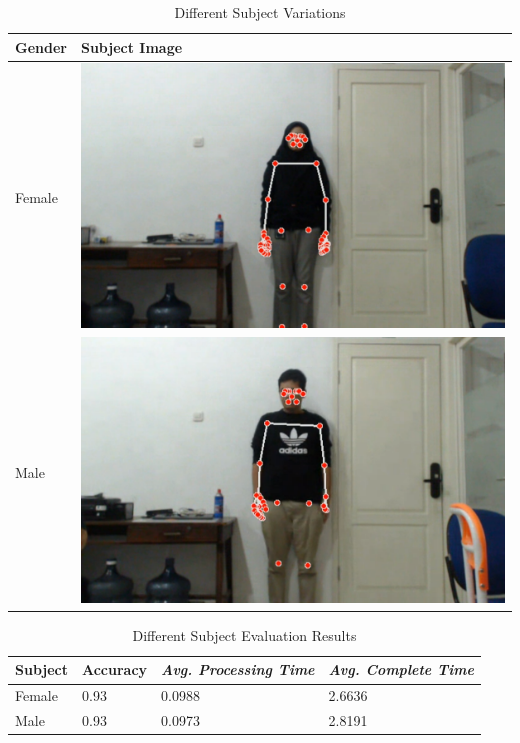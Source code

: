 \begin{table}[H]
  \caption{Different Subject Variations}
  \label{tb:subjectconditions}
  \centering
  \begin{tabular}{ll}
    \hline
    \textbf{Gender} & \textbf{Subject Image} \\
    \hline
    Female & \includegraphics[scale=0.12]{gambar/bab4-rani.png} \\
    \hline
    Male & \includegraphics[scale=0.12]{gambar/bab4-evan.png} \\
    \hline
  \end{tabular}
\end{table}

\begin{table}[H]
  \caption{Different Subject Evaluation Results}
  \label{tb:subjectevaluation}
  \centering
  \begin{tabular}{llll}
    \hline
    \textbf{Subject} & \textbf{Accuracy} & \emph{\textbf{Avg. Processing Time}} & \emph{\textbf{Avg. Complete Time}} \\
    \hline
    Female & 0.93 & 0.0988 & 2.6636 \\
    Male & 0.93 & 0.0973 & 2.8191 \\
    \hline
  \end{tabular}
\end{table}

